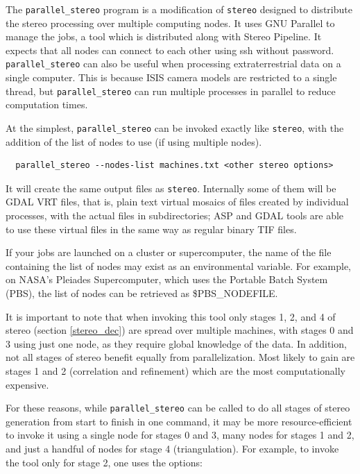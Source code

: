 The \texttt{parallel\_stereo} program is a modification of
\texttt{stereo} designed to distribute the stereo processing over
multiple computing nodes. It uses GNU Parallel to manage the jobs, a tool which
is distributed along with Stereo Pipeline. It expects that all nodes
can connect to each other using ssh without password. \texttt{parallel\_stereo}
can also be useful when processing extraterrestrial data on a single computer.
This is because ISIS camera models are restricted to a single thread, but
\texttt{parallel\_stereo} can run multiple processes in parallel to reduce
computation times.

At the simplest, \texttt{parallel\_stereo} can be invoked exactly like \texttt{stereo},
with the addition of the list of nodes to use (if using multiple nodes).

\begin{verbatim}
  parallel_stereo --nodes-list machines.txt <other stereo options>
\end{verbatim}

It will create the same output files as \texttt{stereo}. Internally
some of them will be GDAL VRT files, that is, plain text virtual mosaics 
of files created by individual processes, with the actual files in subdirectories;
ASP and GDAL tools are able to use these
virtual files in the same way as regular binary TIF files.

If your jobs are launched on a cluster or supercomputer, the name of the
file containing the list of nodes may exist as an environmental
variable. For example, on NASA's Pleiades Supercomputer, which uses the
Portable Batch System (PBS), the list of nodes can be retrieved as
\$PBS\_NODEFILE.

It is important to note that when invoking this tool only stages 1, 2,
and 4 of stereo (section \ref{stereo_dec}) are spread over multiple
machines, with stages 0 and 3 using just one node, as they require
global knowledge of the data. In addition, not all stages of stereo
benefit equally from parallelization. Most likely to gain are stages 1
and 2 (correlation and refinement) which are the most computationally
expensive.

For these reasons, while \texttt{parallel\_stereo} can be called to do
all stages of stereo generation from start to finish in one command, it
may be more resource-efficient to invoke it using a single node for
stages 0 and 3, many nodes for stages 1 and 2, and just a handful of
nodes for stage 4 (triangulation). For example, to invoke the tool
only for stage 2, one uses the options:

